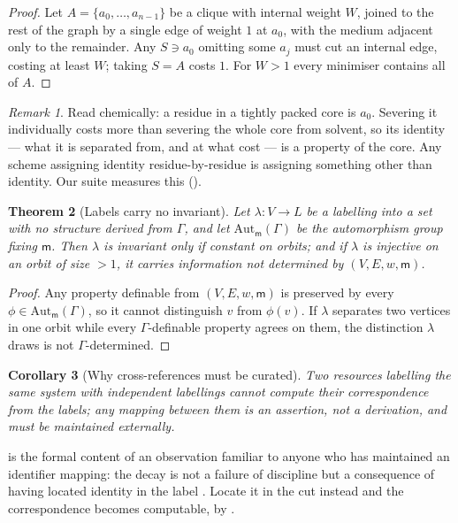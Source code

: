 \documentclass[11pt,twocolumn,a4paper]{article}
\theoremstyle{thmstyle}
\newtheorem{theorem}{Theorem}[section]
\newtheorem{corollary}[theorem]{Corollary}
\theoremstyle{definition}
\theoremstyle{remark}
\newtheorem{remark}[theorem]{Remark}
\newcommand{\Gph}{\Gamma}
\newcommand{\med}{\mathsf{m}}
\begin{document}
\begin{proof}
Let $A=\{a_0,\dots,a_{n-1}\}$ be a clique with internal weight $W$, joined to
the rest of the graph by a single edge of weight $1$ at $a_0$, with the medium
adjacent only to the remainder. Any $S \ni a_0$ omitting some $a_j$ must cut
an internal edge, costing at least $W$; taking $S=A$ costs $1$. For $W>1$
every minimiser contains all of $A$.
\end{proof}

\begin{remark}
Read chemically: a residue in a tightly packed core is $a_0$. Severing it
individually costs more than severing the whole core from solvent, so its
identity --- what it is separated from, and at what cost --- is a property of
the core. Any scheme assigning identity residue-by-residue is assigning
something other than identity. Our suite measures this
().
\end{remark}

\begin{theorem}[Labels carry no invariant]
\label{thm:labels}
Let $\lambda: V \to L$ be a labelling into a set with no structure derived
from $\Gph$, and let $\mathrm{Aut}_\med(\Gph)$ be the automorphism group
fixing $\med$. Then $\lambda$ is invariant only if constant on orbits; and if
$\lambda$ is injective on an orbit of size $>1$, it carries information not
determined by $(V,E,w,\med)$.
\end{theorem}

\begin{proof}
Any property definable from $(V,E,w,\med)$ is preserved by every
$\phi \in \mathrm{Aut}_\med(\Gph)$, so it cannot distinguish $v$ from
$\phi(v)$. If $\lambda$ separates two vertices in one orbit while every
$\Gph$-definable property agrees on them, the distinction $\lambda$ draws is
not $\Gph$-determined.
\end{proof}

\begin{corollary}[Why cross-references must be curated]
\label{cor:crossref}
Two resources labelling the same system with independent labellings cannot
compute their correspondence from the labels; any mapping between them is an
assertion, not a derivation, and must be maintained externally.
\end{corollary}

 is the formal content of an observation familiar to anyone
who has maintained an identifier mapping: the decay is not a failure of
discipline but a consequence of having located identity in the label
\citep{wren2008,mcmurry2017}. Locate
it in the cut instead and the correspondence becomes computable, by
.
\end{document}
